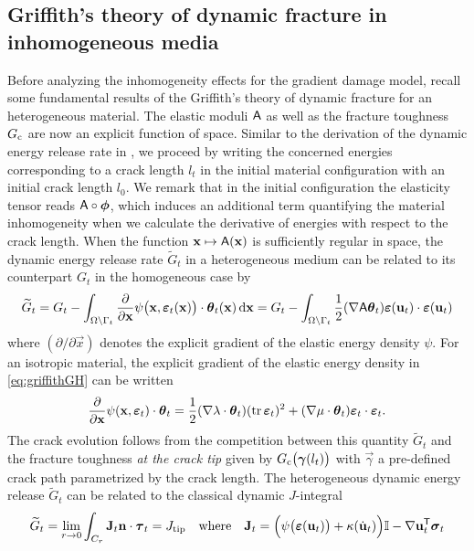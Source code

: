 \subsection{Griffith's theory of dynamic fracture in inhomogeneous media} \label{sec:griffithH}
Before analyzing the inhomogeneity effects for the gradient damage model, recall some fundamental results of the Griffith's theory of dynamic fracture for an heterogeneous material. The elastic moduli $\mathsf{A}$ as well as the fracture toughness $G_\mathrm{c}$ are now an explicit function of space. Similar to the derivation of the dynamic energy release rate in \cite{LiMarigo:2015}, we proceed by writing the concerned energies corresponding to a crack length $l_t$ in the initial material configuration with an initial crack length $l_0$. We remark that in the initial configuration the elasticity tensor reads $\tens{A}\circ\philt$, which induces an additional term quantifying the material inhomogeneity when we calculate the derivative of energies with respect to the crack length. When the function $\vec{x}\mapsto\tens{A}(\vec{x})$ is sufficiently regular in space, the dynamic energy release rate $\widetilde{G}_t$ in a heterogeneous medium can be related to its counterpart $G_t$ in the homogeneous case by 
\begin{equation} \label{eq:griffithGH}
\widetilde{G}_t=G_t-\int_\domaint\frac{\partial}{\partial\vec{x}}\psi\bigl(\vec{x},\eps_t(\vec{x})\bigr)\cdot\vtheta_t(\vec{x})\D{\vec{x}}=G_t-\int_\domaint\frac{1}{2}(\nabla\tens{A}\vtheta_t)\eps(\vec{u}_t)\cdot\eps(\vec{u}_t)
\end{equation}
where $(\partial/\partial\vec{x})$ denotes the explicit gradient of the elastic energy density $\psi$. For an isotropic material, the explicit gradient of the elastic energy density in \eqref{eq:griffithGH} can be written
\[
\frac{\partial}{\partial\vec{x}}\psi(\vec{x},\eps_t)\cdot\vtheta_t=\frac{1}{2}(\nabla\lambda\cdot\vtheta_t)(\tr\eps_t)^2+(\nabla\mu\cdot\vtheta_t)\eps_t\cdot\eps_t.
\]
The crack evolution follows from the competition between this quantity $\widetilde{G}_t$ and the fracture toughness \emph{at the crack tip} given by $\gc\bigl(\vec{\gamma}(l_t)\bigr)$ with $\vec{\gamma}$ a pre-defined crack path parametrized by the crack length. The heterogeneous dynamic energy release $\widetilde{G}_t$ can be related to the classical dynamic $J$-integral
\begin{equation} \label{eq:Jdyn}
\widetilde{G}_t=\lim_{r\to 0}\int_{C_r}\vec{J}_t\vec{n}\cdot\vtau_t=J_\mathrm{tip}\quad\text{where}\quad\vec{J}_t=\Bigl(\psi\bigl(\eps(\vec{u}_t)\bigr)+\kappa(\dot{\vec{u}}_t)\Bigr)\mathbb{I}-\nabla\vec{u}_t^\mT\sig_t
\end{equation}
